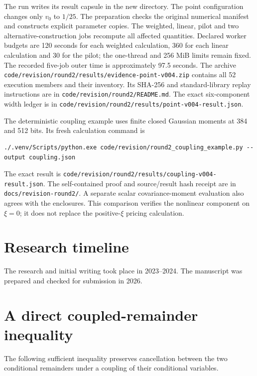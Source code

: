 The run writes its result capsule in the new directory. The point configuration
changes only \(v_0\) to \(1/25\). The preparation checks
the original numerical manifest and constructs explicit parameter copies.
The weighted, linear, pilot and two alternative-construction jobs recompute
all affected quantities. Declared worker budgets are 120 seconds for each
weighted calculation, 360 for each linear calculation and 30 for the pilot;
the one-thread and 256 MiB limits remain fixed. The recorded five-job outer time
is approximately 97.5 seconds. The archive
\texttt{code/revision/round2/results/evidence-point-v004.zip} contains all 52
execution members and their inventory. Its SHA-256 and standard-library replay
instructions are in \texttt{code/revision/round2/README.md}. The exact six-component
width ledger is in \texttt{code/revision/round2/results/point-v004-result.json}.

The deterministic coupling example uses finite closed Gaussian moments at
384 and 512 bits. Its fresh calculation command is

\begin{verbatim}
./.venv/Scripts/python.exe code/revision/round2_coupling_example.py --output coupling.json
\end{verbatim}

The exact result is \texttt{code/revision/round2/results/coupling-v004-result.json}.
The self-contained proof and source/result hash receipt are in
\texttt{docs/revision-round2/}. A separate scalar covariance-moment evaluation
also agrees with the enclosures. This comparison verifies the nonlinear
component on \(\xi=0\); it does not replace the positive-\(\xi\) pricing calculation.

\section{Research timeline}

The research and initial writing took place in 2023--2024.
The manuscript was prepared and checked for submission in 2026.

\section{A direct coupled-remainder inequality}

The following sufficient inequality preserves cancellation between the two
conditional remainders under a coupling of their conditional variables.

